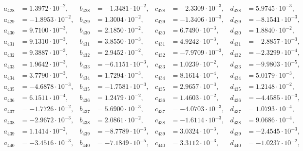 \begin{align*}
  a_{ 428 } &= 1.3972 \cdot 10^{ -2 }, & b_{ 428 } &= -1.3481 \cdot 10^{ -2 }, & c_{ 428 } &= -2.3309 \cdot 10^{ -3 }, & d_{ 428 } &= 5.9745 \cdot 10^{ -3 }, \\ 
  a_{ 429 } &= -1.8953 \cdot 10^{ -2 }, & b_{ 429 } &= 1.3004 \cdot 10^{ -2 }, & c_{ 429 } &= -1.3406 \cdot 10^{ -3 }, & d_{ 429 } &= -8.1541 \cdot 10^{ -3 }, \\ 
  a_{ 430 } &= 9.7100 \cdot 10^{ -3 }, & b_{ 430 } &= 2.1850 \cdot 10^{ -2 }, & c_{ 430 } &= 6.7490 \cdot 10^{ -3 }, & d_{ 430 } &= 1.8840 \cdot 10^{ -2 }, \\ 
  a_{ 431 } &= 9.1310 \cdot 10^{ -3 }, & b_{ 431 } &= 3.8550 \cdot 10^{ -3 }, & c_{ 431 } &= 4.9242 \cdot 10^{ -3 }, & d_{ 431 } &= -2.8857 \cdot 10^{ -3 }, \\ 
  a_{ 432 } &= 9.3887 \cdot 10^{ -3 }, & b_{ 432 } &= 2.9452 \cdot 10^{ -2 }, & c_{ 432 } &= -7.9709 \cdot 10^{ -3 }, & d_{ 432 } &= -2.3299 \cdot 10^{ -4 }, \\ 
  a_{ 433 } &= 1.9642 \cdot 10^{ -3 }, & b_{ 433 } &= -6.1151 \cdot 10^{ -3 }, & c_{ 433 } &= 1.0239 \cdot 10^{ -2 }, & d_{ 433 } &= -9.9803 \cdot 10^{ -5 }, \\ 
  a_{ 434 } &= 3.7790 \cdot 10^{ -3 }, & b_{ 434 } &= 1.7294 \cdot 10^{ -3 }, & c_{ 434 } &= 8.1614 \cdot 10^{ -4 }, & d_{ 434 } &= 5.0179 \cdot 10^{ -3 }, \\ 
  a_{ 435 } &= -4.6878 \cdot 10^{ -3 }, & b_{ 435 } &= -1.7581 \cdot 10^{ -3 }, & c_{ 435 } &= 2.9657 \cdot 10^{ -3 }, & d_{ 435 } &= 1.2148 \cdot 10^{ -2 }, \\ 
  a_{ 436 } &= 6.1511 \cdot 10^{ -4 }, & b_{ 436 } &= 1.2479 \cdot 10^{ -2 }, & c_{ 436 } &= 1.4603 \cdot 10^{ -2 }, & d_{ 436 } &= -4.4585 \cdot 10^{ -3 }, \\ 
  a_{ 437 } &= -1.7726 \cdot 10^{ -2 }, & b_{ 437 } &= 5.6900 \cdot 10^{ -3 }, & c_{ 437 } &= -4.0703 \cdot 10^{ -3 }, & d_{ 437 } &= 1.0793 \cdot 10^{ -4 }, \\ 
  a_{ 438 } &= -2.9672 \cdot 10^{ -3 }, & b_{ 438 } &= 2.0861 \cdot 10^{ -2 }, & c_{ 438 } &= -1.6114 \cdot 10^{ -3 }, & d_{ 438 } &= 9.0686 \cdot 10^{ -4 }, \\ 
  a_{ 439 } &= 1.1414 \cdot 10^{ -2 }, & b_{ 439 } &= -8.7789 \cdot 10^{ -3 }, & c_{ 439 } &= 3.0324 \cdot 10^{ -3 }, & d_{ 439 } &= -2.4545 \cdot 10^{ -3 }, \\ 
  a_{ 440 } &= -3.4516 \cdot 10^{ -3 }, & b_{ 440 } &= -7.1849 \cdot 10^{ -5 }, & c_{ 440 } &= 3.3112 \cdot 10^{ -3 }, & d_{ 440 } &= -1.0237 \cdot 10^{ -2 }, \\ 

\end{align*}
